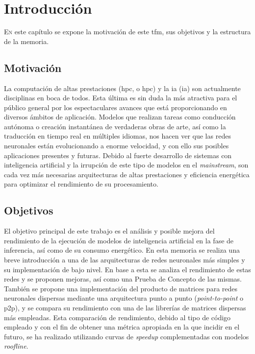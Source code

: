 \chapter{Introducción}
\label{chap:introducion}

\lettrine{E}{n} este capítulo se expone la motivación de este \acrlong{tfm}, sus objetivos y la estructura de la memoria.

\section{Motivación}
\label{sec:motivacion}
La computación de altas prestaciones (\acrshort{hpc}, o \acrlong{hpc}) y la \acrlong{ia} (\acrshort{ia}) son actualmente disciplinas en boca de todos. Esta última es sin duda la más atractiva para el público general por los espectaculares avances que está proporcionando en diversos ámbitos de aplicación. Modelos que realizan tareas como conducción autónoma o creación instantánea de verdaderas obras de arte, así como la traducción en tiempo real en múltiples idiomas, nos hacen ver que las redes neuronales están evolucionando a enorme velocidad, y con ello sus posibles aplicaciones presentes y futuras. Debido al fuerte desarrollo de sistemas con inteligencia artificial y la irrupción de este tipo de modelos en el \textit{mainstream}, son cada vez más necesarias arquitecturas de altas prestaciones y eficiencia energética para optimizar el rendimiento de su procesamiento.

\section{Objetivos}
\label{sec:objetivos}
El objetivo principal de este trabajo es el análisis y posible mejora del rendimiento de la ejecución de modelos de inteligencia artificial en la fase de inferencia, así como de su consumo energético. En esta memoria se realiza una breve introducción a una de las arquitecturas de redes neuronales más simples y su implementación de bajo nivel. En base a esta se analiza el rendimiento de estas redes y se proponen mejoras, así como una Prueba de Concepto de las mismas. También se propone una implementación del producto de matrices para redes neuronales dispersas mediante una arquitectura punto a punto (\textit{point-to-point} o p2p), y se compara su rendimiento con una de las librerías de matrices dispersas más empleadas. Esta comparación de rendimiento, debido al tipo de código empleado y con el fin de obtener una métrica apropiada en la que incidir en el futuro, se ha realizado utilizando curvas de \textit{speedup} complementadas con modelos \textit{roofline}.

